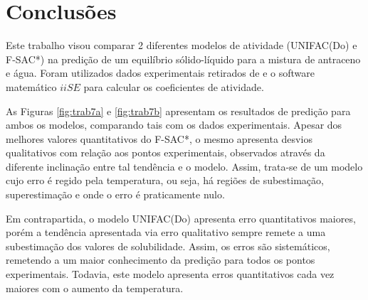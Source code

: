 \clearpage

\section{Conclusões}

Este trabalho visou comparar 2 diferentes modelos de atividade (UNIFAC(Do) 
e F-SAC*) na predição de um equilíbrio sólido-líquido para a mistura de 
antraceno e água. Foram utilizados dados experimentais retirados de
 e o software matemático $iiSE$ para calcular os coeficientes de atividade.
 
As Figuras \ref{fig:trab7a} e \ref{fig:trab7b} apresentam os resultados de
predição para ambos os modelos, comparando tais com os dados experimentais. 
Apesar dos melhores valores quantitativos do F-SAC*, o mesmo apresenta desvios 
qualitativos com relação aos pontos experimentais, observados através da
diferente inclinação entre tal tendência e o modelo. Assim, trata-se de um 
modelo cujo erro é regido pela temperatura, ou seja, há regiões de 
subestimação, superestimação e onde o erro é praticamente nulo.

Em contrapartida, o modelo UNIFAC(Do) apresenta erro quantitativos maiores, 
porém a tendência apresentada via erro qualitativo sempre remete a uma 
subestimação dos valores de solubilidade. Assim, os erros são sistemáticos,
remetendo a um maior conhecimento da predição para todos os pontos 
experimentais. Todavia, este modelo apresenta erros quantitativos cada vez
maiores com o aumento da temperatura.

